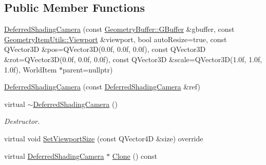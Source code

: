 \subsection*{Public Member Functions}
\begin{DoxyCompactItemize}
\item 
\mbox{\hyperlink{class_geometry_engine_1_1_geometry_world_item_1_1_geometry_camera_1_1_deferred_shading_camera_a5efe7bec9b35953fe0ab0abf92a55248}{Deferred\+Shading\+Camera}} (const \mbox{\hyperlink{class_geometry_engine_1_1_geometry_buffer_1_1_g_buffer}{Geometry\+Buffer\+::\+G\+Buffer}} \&gbuffer, const \mbox{\hyperlink{class_geometry_engine_1_1_geometry_item_utils_1_1_viewport}{Geometry\+Item\+Utils\+::\+Viewport}} \&viewport, bool auto\+Resize=true, const Q\+Vector3D \&pos=Q\+Vector3D(0.\+0f, 0.\+0f, 0.\+0f), const Q\+Vector3\+D \&rot=\+Q\+Vector3\+D(0.\+0f, 0.\+0f, 0.\+0f), const Q\+Vector3\+D \&scale=\+Q\+Vector3\+D(1.\+0f, 1.\+0f, 1.\+0f), World\+Item $\ast$parent=nullptr)
\item 
\mbox{\hyperlink{class_geometry_engine_1_1_geometry_world_item_1_1_geometry_camera_1_1_deferred_shading_camera_a3fddaea07dd897fe83081ff45cf99416}{Deferred\+Shading\+Camera}} (const \mbox{\hyperlink{class_geometry_engine_1_1_geometry_world_item_1_1_geometry_camera_1_1_deferred_shading_camera}{Deferred\+Shading\+Camera}} \&ref)
\item 
\mbox{\label{class_geometry_engine_1_1_geometry_world_item_1_1_geometry_camera_1_1_deferred_shading_camera_ae5eb53c675d8a7ad9070853f4b5d4951}} 
virtual \mbox{\hyperlink{class_geometry_engine_1_1_geometry_world_item_1_1_geometry_camera_1_1_deferred_shading_camera_ae5eb53c675d8a7ad9070853f4b5d4951}{$\sim$\+Deferred\+Shading\+Camera}} ()
\begin{DoxyCompactList}\small\item\em Destructor. \end{DoxyCompactList}\item 
virtual void \mbox{\hyperlink{class_geometry_engine_1_1_geometry_world_item_1_1_geometry_camera_1_1_deferred_shading_camera_a16da38cfd723b755a63c372c08bbedf7}{Set\+Viewport\+Size}} (const Q\+Vector4D \&size) override
\item 
virtual \mbox{\hyperlink{class_geometry_engine_1_1_geometry_world_item_1_1_geometry_camera_1_1_deferred_shading_camera}{Deferred\+Shading\+Camera}} $\ast$ \mbox{\hyperlink{class_geometry_engine_1_1_geometry_world_item_1_1_geometry_camera_1_1_deferred_shading_camera_ac020fe14bc32f3fdbd0c9423af1c975f}{Clone}} () const
\end{DoxyCompactItemize}
